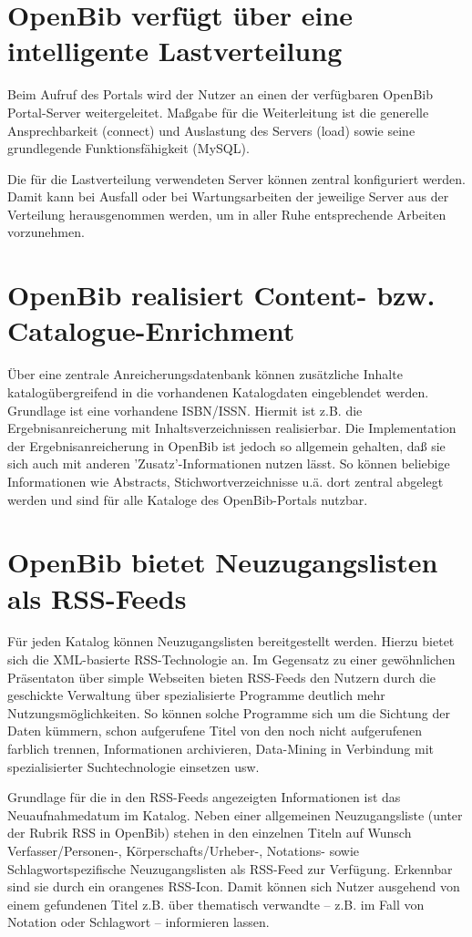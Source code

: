 \documentclass[11pt, twoside, a4paper, BCOR8mm, DIV12, bibtotoc,idxtotoc]{scrbook}
\begin{document}
\section{OpenBib verfügt über eine intelligente Lastverteilung}
Beim Aufruf des Portals wird der Nutzer an einen der verfügbaren
OpenBib Portal-Server weitergeleitet. Maßgabe für die Weiterleitung
ist die generelle Ansprechbarkeit (connect) und Auslastung des Servers
(load) sowie seine grundlegende Funktionsfähigkeit (MySQL).

Die für die Lastverteilung verwendeten Server können zentral
konfiguriert werden. Damit kann bei Ausfall oder bei
Wartungsarbeiten der jeweilige Server aus der Verteilung
herausgenommen werden, um in aller Ruhe entsprechende Arbeiten
vorzunehmen.

\section{OpenBib realisiert Content- bzw. Catalogue-Enrichment}
Über eine zentrale Anreicherungsdatenbank können zusätzliche
Inhalte katalogübergreifend in die vorhandenen Katalogdaten
eingeblendet werden. Grundlage ist eine vorhandene ISBN/ISSN. Hiermit
ist z.B. die Ergebnisanreicherung mit Inhaltsverzeichnissen
realisierbar. Die Im\-ple\-men\-ta\-tion der Ergebnisanreicherung in OpenBib
ist jedoch so allgemein gehalten, daß sie sich auch mit anderen
'Zusatz'-Informationen nutzen lässt. So können beliebige
Informationen wie Abstracts, Stichwortverzeichnisse u.ä. dort zentral
abgelegt werden und sind für alle Kataloge des OpenBib-Portals
nutzbar.

\section{OpenBib bietet Neuzugangslisten als RSS-Feeds}
Für jeden Katalog können Neuzugangslisten bereitgestellt werden.
Hierzu bietet sich die XML-basierte RSS-Technologie an. Im Gegensatz
zu einer gewöhnlichen Präsentaton über simple Webseiten bieten
RSS-Feeds den Nutzern durch die geschickte Verwaltung über
spezialisierte Programme deutlich mehr Nutzungsmöglichkeiten. So
können solche Programme sich um die Sichtung der Daten kümmern,
schon aufgerufene Titel von den noch nicht aufgerufenen farblich
trennen, Informationen archivieren, Data-Mining in Verbindung mit
spezialisierter Such\-tech\-no\-lo\-gie einsetzen usw.

Grundlage für die in den RSS-Feeds angezeigten Informationen ist das
Neuaufnahmedatum im Katalog. Neben einer allgemeinen Neuzugangsliste
(unter der Rubrik RSS in OpenBib) stehen in den einzelnen Titeln auf
Wunsch Verfasser/Personen-, Körperschafts/Urheber-, Notations- sowie
Schlagwortspezifische Neuzugangslisten als RSS-Feed zur Verfügung.
Erkennbar sind sie durch ein orangenes RSS-Icon. Damit können sich
Nutzer ausgehend von einem gefundenen Titel z.B. über thematisch
verwandte -- z.B. im Fall von Notation oder Schlagwort -- informieren
lassen.
\end{document}
